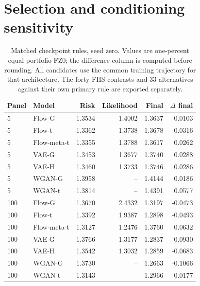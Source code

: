 \documentclass[11pt]{article}
\theoremstyle{definition}\newtheorem{definition}[theorem]{Definition}
\theoremstyle{remark}\newtheorem{remark}[theorem]{Remark}
\begin{document}
\section{Selection and conditioning sensitivity}\label{app:controls}
\begin{table}[htbp]
\centering\footnotesize
\setlength{\tabcolsep}{4pt}
\begin{tabular}{llrrrr}
\toprule
Panel & Model & Risk & Likelihood & Final & $\Delta$ final \\
\midrule
5 & Flow-G & 1.3534 & 1.4002 & 1.3637 & 0.0103 \\
5 & Flow-t & 1.3362 & 1.3738 & 1.3678 & 0.0316 \\
5 & Flow-meta-t & 1.3355 & 1.3788 & 1.3617 & 0.0262 \\
5 & VAE-G & 1.3453 & 1.3677 & 1.3740 & 0.0288 \\
5 & VAE-H & 1.3460 & 1.3733 & 1.3746 & 0.0286 \\
5 & WGAN-G & 1.3958 & -- & 1.4144 & 0.0186 \\
5 & WGAN-t & 1.3814 & -- & 1.4391 & 0.0577 \\
100 & Flow-G & 1.3670 & 2.4332 & 1.3197 & -0.0473 \\
100 & Flow-t & 1.3392 & 1.9387 & 1.2898 & -0.0493 \\
100 & Flow-meta-t & 1.3127 & 1.2476 & 1.3760 & 0.0632 \\
100 & VAE-G & 1.3766 & 1.3177 & 1.2837 & -0.0930 \\
100 & VAE-H & 1.3542 & 1.3032 & 1.2859 & -0.0683 \\
100 & WGAN-G & 1.3730 & -- & 1.2663 & -0.1066 \\
100 & WGAN-t & 1.3143 & -- & 1.2966 & -0.0177 \\
\bottomrule
\end{tabular}
\caption{Matched checkpoint rules, seed zero. Values are one-percent equal-portfolio FZ0; the difference column is computed before rounding. All candidates use the common training trajectory for that architecture. The forty FHS contrasts and 33 alternatives against their own primary rule are exported separately.}\label{tab:r4-selection}
\end{table}
\end{document}
